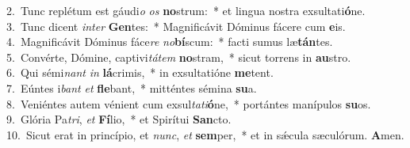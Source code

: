 {2.~}Tunc replétum est gáudi\textit{o} \textit{os} \textbf{no}strum:~* et lingua nostra exsultati\textbf{ó}ne.\\
{3.~}Tunc dicent \textit{in}\textit{ter} \textbf{Gen}tes:~* Magnificávit Dóminus fácere cum \textbf{e}is.\\
{4.~}Magnificávit Dóminus fáce\textit{re} \textit{no}\textbf{bí}scum:~* facti sumus læ\textbf{tán}tes.\\
{5.~}Convérte, Dómine, captivi\textit{tá}\textit{tem} \textbf{no}stram,~* sicut torrens in \textbf{au}stro.\\
{6.~}Qui sémi\textit{nant} \textit{in} \textbf{lá}crimis,~* in exsultatióne \textbf{me}tent.\\
{7.~}Eúntes i\textit{bant} \textit{et} \textbf{fle}bant,~* mitténtes sémina \textbf{su}a.\\
{8.~}Veniéntes autem vénient cum exsul\textit{ta}\textit{ti}\textbf{ó}ne,~* portántes manípulos \textbf{su}os.\\
{9.~}Glória Pa\textit{tri}, \textit{et} \textbf{Fí}lio,~* et Spirítui \textbf{San}cto.\\
{10.~}Sicut erat in princípio, et \textit{nunc}, \textit{et} \textbf{sem}per,~* et in sǽcula sæculórum. \textbf{A}men.\\
